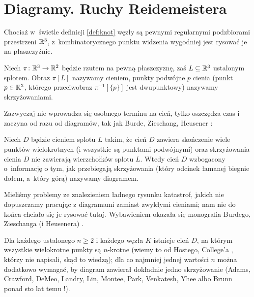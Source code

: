
\section{Diagramy. Ruchy Reidemeistera}

Chociaż w~świetle definicji \ref{def:knot} węzły są pewnymi regularnymi podzbiorami przestrzeni $\mathbb R^3$, z~kombinatorycznego punktu widzenia wygodniej jest rysować je na płaszczyźnie.

\begin{definition}
%
%  
\label{def:crossing}%
    Niech $\pi \colon \mathbb R^3 \to \mathbb R^2$ będzie rzutem na pewną płaszczyznę, zaś $L \subseteq \mathbb R^3$ ustalonym splotem.
    Obraz $\pi[L]$ nazywamy cieniem, punkty podwójne $p$ cienia (punkt $p \in \mathbb R^2$, którego przeciwobraz $\pi^{-1}[\{p\}]$ jest dwupunktowy) nazywamy skrzyżowaniami.
\end{definition}

Zazwyczaj nie wprowadza się osobnego terminu na cień, tylko oszczędza czas i zaczyna od razu od diagramów, tak jak Burde, Zieschang, Heusener \cite[s. 9]{burde2014}:

\begin{definition}[diagram]
%
    Niech $D$ będzie cieniem splotu $L$ takim, że cień $D$ zawiera skończenie wiele punktów wielokrotnych (i wszystkie są punktami podwójnymi) oraz skrzyżowania cienia $D$ nie zawierają wierzchołków splotu $L$.
    Wtedy cień $D$ wzbogacony o~informację o tym, jak przebiegają skrzyżowania (który odcinek łamanej biegnie dołem, a~który górą) nazywamy diagramem.
%
%
\end{definition}

Mieliśmy problemy ze znalezieniem ładnego rysunku katastrof, jakich nie dopuszczamy pracując z diagramami zamiast zwykłymi cieniami; nam nie do końca chciało się je rysować tutaj.
Wybawieniem okazała się monografia Burdego, Zieschanga (i Heusenera) \cite[s. 9]{burde2014}.

Dla każdego ustalonego $n \ge 2$ i każdego węzła $K$ istnieje cień $D$, na którym wszystkie wielokrotne punkty są $n$-krotne (wiemy to od Hostego, College'a \cite[s. 11]{adams2021}, którzy nie napisali, skąd to wiedzą);
%
%
dla co najmniej jednej wartości $n$ można dodatkowo wymagać, by diagram zawierał dokładnie jedno skrzyżowanie (Adams, Crawford, DeMeo, Landry, Lin, Montee, Park, Venkatesh, Yhee \cite{venkatesh2015} albo Brunn ponad sto lat temu \cite[s. 28]{adams2021}!).
%
%
%
%
%
%
%
%

